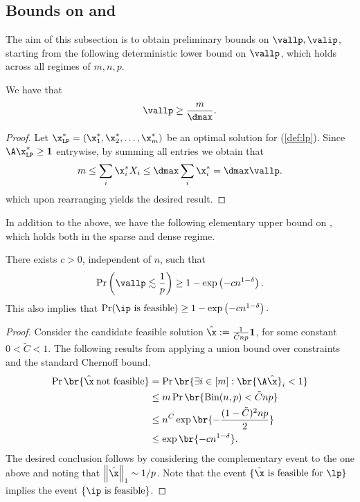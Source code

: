 \subsection{Bounds on \vallp and \valip}\label{sec:bounds_LP_IP}
\label{sec:bounds}
The aim of this subsection is to obtain preliminary bounds on $\vallp, \valip$, starting from the following deterministic lower bound on $\vallp$, which holds across all regimes of $m,n,p$.
\begin{lemma}
\label{lemma:lp_lb} We have that
\[\vallp \geq \frac{m}{\dmax}.\]
\end{lemma}
\begin{proof}
Let $\x^*_{\texttt{LP}} = (\x_1^*, \x_2^*, \ldots, \x_m^*)$ be an optimal solution for (\ref{def:lp}). Since $\A \x^*_{\texttt{LP}} \geq \mathbf{1}$ entrywise, by summing all entries we obtain that  
\[
m \leq \sum_{i} \x^*_i X_i \leq \dmax\sum_i \x^*_i = \dmax \vallp.
\]
which upon rearranging yields the desired result.
\end{proof}
\noindent
In addition to the above, we have the following elementary upper bound on \vallp, which holds both in the sparse and dense regime. 
\begin{lemma}
\label{lemma:lp_ub}
    There exists $c > 0$, independent of $n$, such that
    \begin{equation*}
    \Pr\left(\vallp \lesssim \frac{1}{p}\right) \geq 1 - \exp\left(-cn^{1-\delta}\right).
\end{equation*}
This also implies that \(\Pr(\ip \text{ is feasible}) \geq 1 - \exp\left(-cn^{1-\delta}\right).\)
\end{lemma}
\begin{proof}
    Consider the candidate feasible solution \(\hat{\x} := \frac{1}{\tilde{C} np} \mathbf{1}\), for some constant $0<\tilde{C}<1$. The following results from applying a union bound over constraints and the standard Chernoff bound.
    \begin{align*}
        \Pr\br{\hat{\x} \: \text{not feasible}} & = \Pr\br{\exists i \in [m]: \br{\A \hat{\x}}_i < 1} \\
        & \leq m \Pr\br{\text{Bin}(n,p)< \tilde{C}np} \\
        & \leq n^C \exp\br{-\frac{(1-\tilde{C})^2np}{2}}\\
        & \leq \exp\br{-c n^{1-\delta}}.
    \end{align*}
The desired conclusion follows by considering the complementary event to the one above and noting that $\left \|\hat{\x}\right\|_1 \sim 1/p$. Note that the event \(\{\hat{\x} \text{ is feasible for } \lp\}\) implies the event \(\{\ip \text{ is feasible}\}\).
\end{proof}

